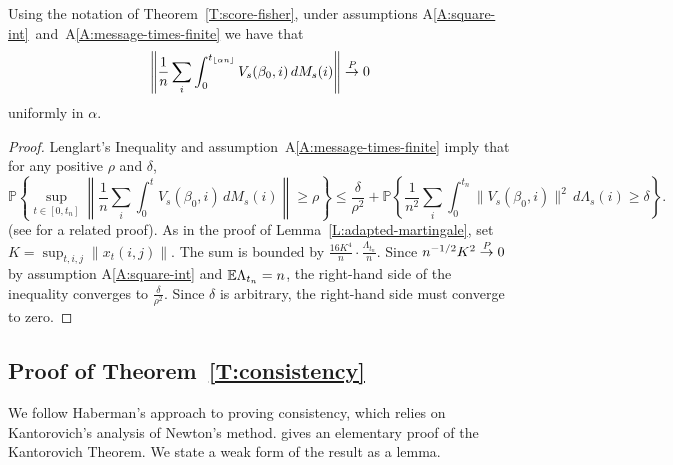\documentclass[final]{statsoc}
\begin{document}
\begin{lemma}\label{L:Lenglart}
Using the notation of Theorem~\ref{T:score-fisher}, under assumptions
A\ref{A:square-int}~and~A\ref{A:message-times-finite} we have that
\[
    \left\|
            \frac{1}{n}
            \sum_i
            \int_0^{t_{\lfloor \alpha n \rfloor}}
                V_s(\beta_0, i) \, dM_s(i)
    \right\|
        \overset{\mathit{P}}{\to} 0
\]
uniformly in $\alpha$.
\end{lemma}

\begin{proof}
Lenglart's \citeyearpar{lenglart1977relation} Inequality and assumption~A\ref{A:message-times-finite} imply that
for any positive $\rho$ and $\delta$,
\begin{equation*}
    \mathbb{P}\left\{
        \sup_{t \in [0,t_n]}
        \left\|
            \frac{1}{n}
            \sum_{i}
            \int_{0}^{t}
                V_s(\beta_0, i) \, dM_s(i)
        \right\|
        \geq \rho
    \right\}
    \leq
    \frac{\delta}{\rho^2}
    +
    \mathbb{P}\left\{
        \frac{1}{n^2}
        \sum_{i}
        \int_{0}^{t_n}
            \| V_s (\beta_0, i) \|^2
            \, d\Lambda_s(i)
        \geq
        \delta
    \right\}.
\end{equation*}
(see \citet[Cor.~3.4.1]{fleming1991counting} for a related proof).  As in the proof of
Lemma~\ref{L:adapted-martingale}, set $K = \sup_{t,i,j} \| x_t(i,j) \|$.
The sum is bounded by $\frac{16 K^4}{n} \cdot \frac{\Lambda_{t_n}}{n}$.
Since $n^{-1/2} K^2 \overset{\mathit{P}}{\to} 0$ by assumption A\ref{A:square-int} and
$\mathbb{E} \Lambda_{t_n} = n$, the right-hand side of the inequality converges to
$\frac{\delta}{\rho^2}$.  Since $\delta$ is arbitrary, the right-hand side
must converge to zero.
\end{proof}


\subsection{Proof of Theorem~\ref{T:consistency}}\label{S:proof-consistency}

We follow Haberman's \citeyearpar{haberman1977maximum} approach to proving
consistency, which relies on Kantorovich's \citeyearpar{kantorovich1952functional} analysis
of Newton's method.  \citet{tapia1971kantorovich} gives an elementary proof of the Kantorovich
Theorem.
We state a weak form of the result as a lemma.
\end{document}
